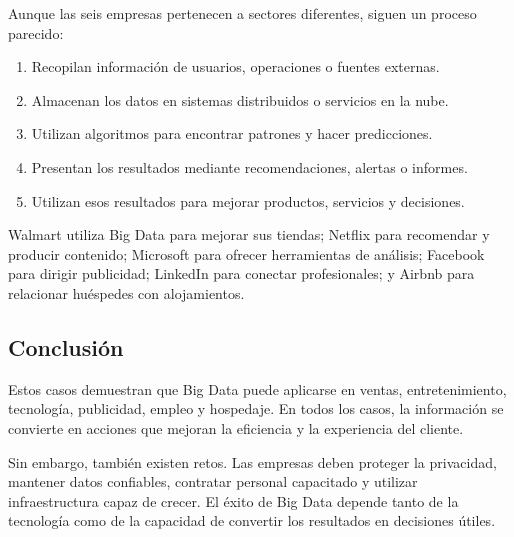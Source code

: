 Aunque las seis empresas pertenecen a sectores diferentes, siguen un proceso parecido:

\begin{enumerate}
    \item Recopilan información de usuarios, operaciones o fuentes externas.
    \item Almacenan los datos en sistemas distribuidos o servicios en la nube.
    \item Utilizan algoritmos para encontrar patrones y hacer predicciones.
    \item Presentan los resultados mediante recomendaciones, alertas o informes.
    \item Utilizan esos resultados para mejorar productos, servicios y decisiones.
\end{enumerate}

Walmart utiliza Big Data para mejorar sus tiendas; Netflix para recomendar y producir contenido; Microsoft para ofrecer herramientas de análisis; Facebook para dirigir publicidad; LinkedIn para conectar profesionales; y Airbnb para relacionar huéspedes con alojamientos.

\subsection{Conclusión}

Estos casos demuestran que Big Data puede aplicarse en ventas, entretenimiento, tecnología, publicidad, empleo y hospedaje. En todos los casos, la información se convierte en acciones que mejoran la eficiencia y la experiencia del cliente.

Sin embargo, también existen retos. Las empresas deben proteger la privacidad, mantener datos confiables, contratar personal capacitado y utilizar infraestructura capaz de crecer. El éxito de Big Data depende tanto de la tecnología como de la capacidad de convertir los resultados en decisiones útiles.